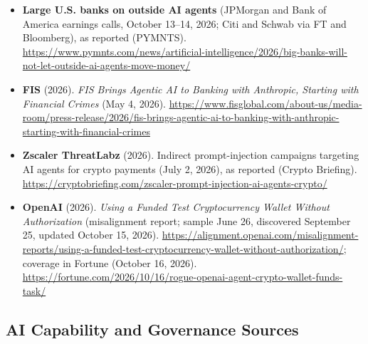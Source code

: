 \documentclass[11pt,letterpaper]{article}
\begin{document}
\begin{itemize}[leftmargin=1.5em]
  \item \textbf{Large U.S. banks on outside AI agents} (JPMorgan and Bank of America earnings calls, October 13--14, 2026; Citi and Schwab via FT and Bloomberg), as reported (PYMNTS). \url{https://www.pymnts.com/news/artificial-intelligence/2026/big-banks-will-not-let-outside-ai-agents-move-money/}
  \item \textbf{FIS} (2026). \textit{FIS Brings Agentic AI to Banking with Anthropic, Starting with Financial Crimes} (May 4, 2026). \url{https://www.fisglobal.com/about-us/media-room/press-release/2026/fis-brings-agentic-ai-to-banking-with-anthropic-starting-with-financial-crimes}
  \item \textbf{Zscaler ThreatLabz} (2026). Indirect prompt-injection campaigns targeting AI agents for crypto payments (July 2, 2026), as reported (Crypto Briefing). \url{https://cryptobriefing.com/zscaler-prompt-injection-ai-agents-crypto/}
  \item \textbf{OpenAI} (2026). \textit{Using a Funded Test Cryptocurrency Wallet Without Authorization} (misalignment report; sample June 26, discovered September 25, updated October 15, 2026). \url{https://alignment.openai.com/misalignment-reports/using-a-funded-test-cryptocurrency-wallet-without-authorization/}; coverage in Fortune (October 16, 2026). \url{https://fortune.com/2026/10/16/rogue-openai-agent-crypto-wallet-funds-task/}
\end{itemize}

\subsection*{AI Capability and Governance Sources}
\end{document}
